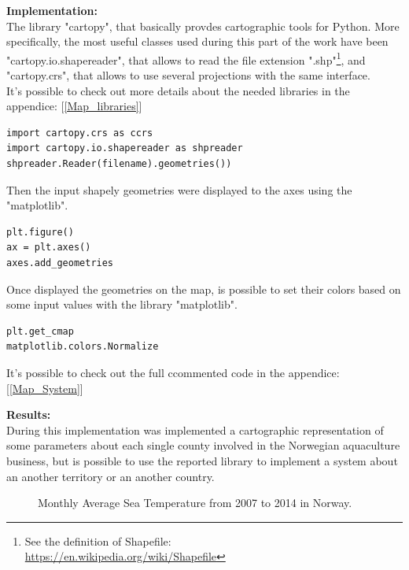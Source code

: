 \textbf{Implementation:}\\
The library "cartopy", that basically provdes cartographic tools for Python. More specifically, the most useful classes used during this part of the work have been "cartopy.io.shapereader", that allows to read the file extension ".shp"\footnote{See the definition of Shapefile: \\ \url{https://en.wikipedia.org/wiki/Shapefile}}, and "cartopy.crs", that allows to use several projections with the same interface.\\
It's possible to check out more details about the needed libraries in the appendice: [\ref{Map_libraries}]
\begin{lstlisting}
import cartopy.crs as ccrs
import cartopy.io.shapereader as shpreader
shpreader.Reader(filename).geometries())
\end{lstlisting}

\newpage

Then the input shapely geometries were displayed  to the axes using the "matplotlib".
\begin{lstlisting}
plt.figure()
ax = plt.axes()
axes.add_geometries
\end{lstlisting}

Once displayed the geometries on the map, is possible to set their colors based on some input values with the library "matplotlib".
\begin{lstlisting}
plt.get_cmap
matplotlib.colors.Normalize
\end{lstlisting}

It's possible to check out the full ccommented code in the appendice: [\ref{Map_System}]

\textbf{Results:} \\
During this implementation was implemented a cartographic representation of some parameters about each single county involved in the Norwegian aquaculture business, but is possible to use the reported library to implement a system about an another territory or an another country.
\begin{figure}[H]
    \caption{Monthly Average Sea Temperature from 2007 to 2014 in Norway.}
\end{figure}
